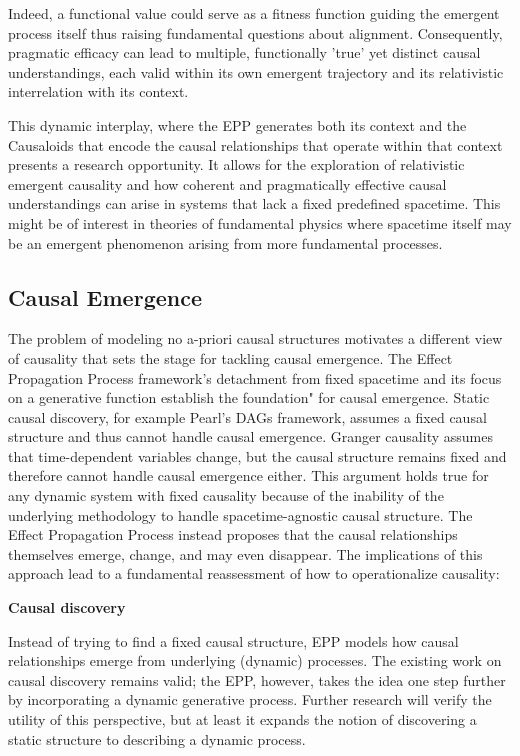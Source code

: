 Indeed, a functional value could serve as a fitness function guiding the emergent process itself thus raising fundamental questions about alignment. Consequently, pragmatic efficacy can lead to multiple, functionally 'true' yet distinct causal understandings, each valid within its own emergent trajectory and its relativistic interrelation with its context.

This dynamic interplay, where the EPP generates both its context and the Causaloids that encode the causal relationships that operate within that context presents a research opportunity. It allows for the exploration of relativistic emergent causality and how coherent and pragmatically effective causal understandings can arise in systems that lack a fixed predefined spacetime. This might be of interest in theories of fundamental physics where spacetime itself may be an emergent phenomenon arising from more fundamental processes.

\subsection{Causal Emergence}
\label{sec:causal_emergence}

The problem of modeling no a-priori causal structures motivates a different view of causality that sets the stage for tackling  causal emergence. The Effect Propagation Process framework's detachment from fixed spacetime and its focus on a generative function establish the foundation" for causal emergence. Static causal discovery, for example Pearl’s DAGs framework, assumes a fixed causal structure and thus cannot handle causal emergence. Granger causality assumes that time-dependent variables change, but the causal structure remains fixed and therefore cannot handle causal emergence either. This argument holds true for any dynamic system with fixed causality because of the inability of the underlying methodology to handle spacetime-agnostic causal structure. The Effect Propagation Process instead proposes that the causal relationships themselves emerge, change, and may even disappear. The implications of this approach lead to a fundamental reassessment of how to operationalize causality:

\textbf{Causal discovery}

Instead of trying to find a fixed causal structure, EPP models how causal relationships emerge from underlying (dynamic) processes. The existing work on causal discovery remains valid; the EPP, however, takes the idea one step further by incorporating a dynamic generative process. Further research will verify the utility of this perspective, but at least it expands the notion of discovering a static structure to describing a dynamic process.

